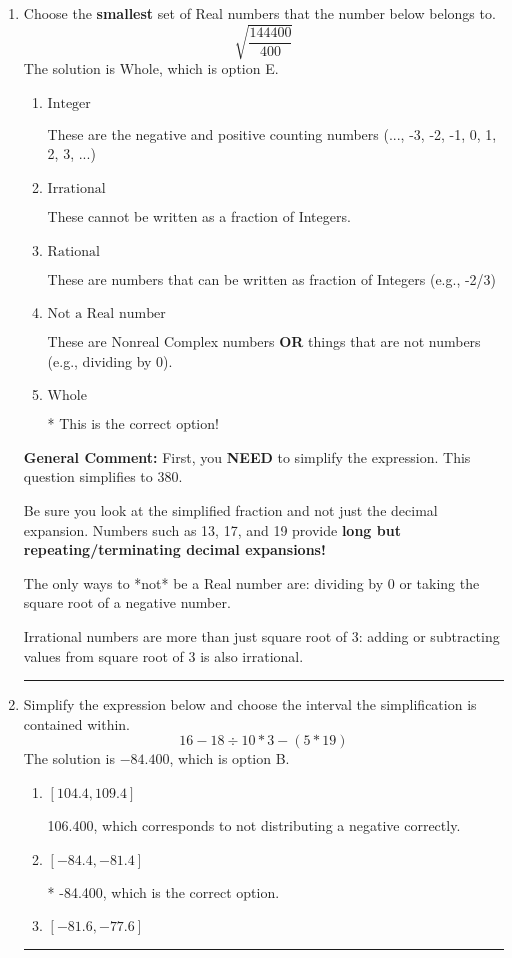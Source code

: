 \documentclass{extbook}[14pt]
\newcommand{\litem}[1]{\item #1

\rule{\textwidth}{0.4pt}}
\begin{document}
\begin{enumerate}
{ Irrational numbers are more than just square root of 3: adding or subtracting values from square root of 3 is also irrational.
}
\litem{
Choose the \textbf{smallest} set of Real numbers that the number below belongs to.
\[ \sqrt{\frac{144400}{400}} \]
The solution is \( \text{Whole} \), which is option E.\begin{enumerate}[label=\Alph*.]
\item \( \text{Integer} \)

These are the negative and positive counting numbers (..., -3, -2, -1, 0, 1, 2, 3, ...)
\item \( \text{Irrational} \)

These cannot be written as a fraction of Integers.
\item \( \text{Rational} \)

These are numbers that can be written as fraction of Integers (e.g., -2/3)
\item \( \text{Not a Real number} \)

These are Nonreal Complex numbers \textbf{OR} things that are not numbers (e.g., dividing by 0).
\item \( \text{Whole} \)

* This is the correct option!
\end{enumerate}

\textbf{General Comment:} First, you \textbf{NEED} to simplify the expression. This question simplifies to $380$. 
 
 Be sure you look at the simplified fraction and not just the decimal expansion. Numbers such as 13, 17, and 19 provide \textbf{long but repeating/terminating decimal expansions!} 
 
 The only ways to *not* be a Real number are: dividing by 0 or taking the square root of a negative number. 
 
 Irrational numbers are more than just square root of 3: adding or subtracting values from square root of 3 is also irrational.
}
\litem{
Simplify the expression below and choose the interval the simplification is contained within.
\[ 16 - 18 \div 10 * 3 - (5 * 19) \]
The solution is \( -84.400 \), which is option B.\begin{enumerate}[label=\Alph*.]
\item \( [104.4, 109.4] \)

 106.400, which corresponds to not distributing a negative correctly.
\item \( [-84.4, -81.4] \)

* -84.400, which is the correct option.
\item \( [-81.6, -77.6] \)


\end{enumerate}}
\end{enumerate}
\end{document}
